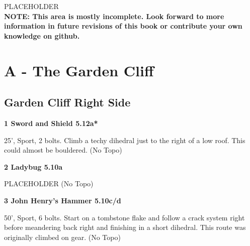 \begin{multicols}{2}



PLACEHOLDER\\

\textbf{NOTE: This area is mostly incomplete. Look forward to more information in future revisions of this book or contribute your own knowledge on github.}\\


\newpage

\section{A - The Garden Cliff}\label{sa:The Garden Cliff}




\needspace{1.5cm}
\subsection*{Garden Cliff Right Side}\label{bf:Garden Cliff Right Side}
	


\needspace{1.5cm}
\label{rt:Sword and Shield}
\colorbox{Goldenrod!50}{
\parbox{0.95\linewidth}{
\textbf{
1 Sword and Shield 5.12a*  
}}}

\begin{adjustwidth}{0.5cm}{}			
25', Sport, 2 bolts. Climb a techy dihedral just to the right of a low roof. This could almost be bouldered. (No Topo)
\end{adjustwidth}



\needspace{1.5cm}
\label{rt:Ladybug}
\colorbox{RoyalBlue!20}{
\parbox{0.95\linewidth}{
\textbf{
2 Ladybug 5.10a  
}}}

\begin{adjustwidth}{0.5cm}{}			
PLACEHOLDER (No Topo)
\end{adjustwidth}



\needspace{1.5cm}
\label{rt:John Henry's Hammer}
\colorbox{RoyalBlue!20}{
\parbox{0.95\linewidth}{
\textbf{
3 John Henry's Hammer 5.10c/d  
}}}

\begin{adjustwidth}{0.5cm}{}			
50', Sport, 6 bolts. Start on a tombstone flake and follow a crack system right before meandering back right and finishing in a short dihedral. This route was originally climbed on gear. (No Topo)
\end{adjustwidth}


\end{multicols}
